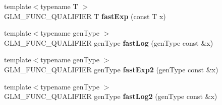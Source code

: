 \begin{DoxyCompactItemize}
\item 
{\footnotesize template$<$typename T $>$ }\\G\+L\+M\+\_\+\+F\+U\+N\+C\+\_\+\+Q\+U\+A\+L\+I\+F\+I\+ER T {\bfseries fast\+Exp} (const T x)\hypertarget{namespaceglm_ae74f5cf7dd2cf7bd620d0e715ce57c05}{}\label{namespaceglm_ae74f5cf7dd2cf7bd620d0e715ce57c05}

\item 
{\footnotesize template$<$typename gen\+Type $>$ }\\G\+L\+M\+\_\+\+F\+U\+N\+C\+\_\+\+Q\+U\+A\+L\+I\+F\+I\+ER gen\+Type {\bfseries fast\+Log} (gen\+Type const \&x)\hypertarget{namespaceglm_a8d28d8da7024cc0a18d156d049a82ce8}{}\label{namespaceglm_a8d28d8da7024cc0a18d156d049a82ce8}

\item 
{\footnotesize template$<$typename gen\+Type $>$ }\\G\+L\+M\+\_\+\+F\+U\+N\+C\+\_\+\+Q\+U\+A\+L\+I\+F\+I\+ER gen\+Type {\bfseries fast\+Exp2} (gen\+Type const \&x)\hypertarget{namespaceglm_a1c48964bb8d608e6ae476f68a31a6a36}{}\label{namespaceglm_a1c48964bb8d608e6ae476f68a31a6a36}

\item 
{\footnotesize template$<$typename gen\+Type $>$ }\\G\+L\+M\+\_\+\+F\+U\+N\+C\+\_\+\+Q\+U\+A\+L\+I\+F\+I\+ER gen\+Type {\bfseries fast\+Log2} (gen\+Type const \&x)\hypertarget{namespaceglm_ae1503280ca86994a0271217cb09335d6}{}\label{namespaceglm_ae1503280ca86994a0271217cb09335d6}


\end{DoxyCompactItemize}
